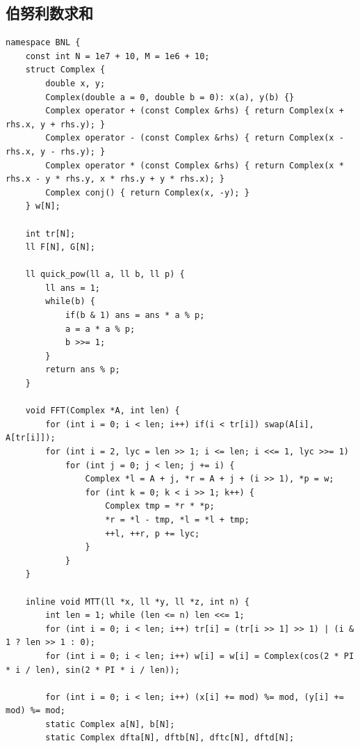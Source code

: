 \documentclass[twoside]{article}
\begin{document}
\subsection{伯努利数求和}
\begin{lstlisting}
namespace BNL {
    const int N = 1e7 + 10, M = 1e6 + 10;
    struct Complex {
        double x, y;
        Complex(double a = 0, double b = 0): x(a), y(b) {}
        Complex operator + (const Complex &rhs) { return Complex(x + rhs.x, y + rhs.y); }
        Complex operator - (const Complex &rhs) { return Complex(x - rhs.x, y - rhs.y); }
        Complex operator * (const Complex &rhs) { return Complex(x * rhs.x - y * rhs.y, x * rhs.y + y * rhs.x); }
        Complex conj() { return Complex(x, -y); }
    } w[N];

    int tr[N];
    ll F[N], G[N];

    ll quick_pow(ll a, ll b, ll p) {
        ll ans = 1;
        while(b) {
            if(b & 1) ans = ans * a % p;
            a = a * a % p;
            b >>= 1;
        }
        return ans % p;
    }

    void FFT(Complex *A, int len) {
        for (int i = 0; i < len; i++) if(i < tr[i]) swap(A[i], A[tr[i]]);
        for (int i = 2, lyc = len >> 1; i <= len; i <<= 1, lyc >>= 1)
            for (int j = 0; j < len; j += i) {
                Complex *l = A + j, *r = A + j + (i >> 1), *p = w;
                for (int k = 0; k < i >> 1; k++) {
                    Complex tmp = *r * *p;
                    *r = *l - tmp, *l = *l + tmp;
                    ++l, ++r, p += lyc;
                }
            }
    }

    inline void MTT(ll *x, ll *y, ll *z, int n) {
        int len = 1; while (len <= n) len <<= 1;
        for (int i = 0; i < len; i++) tr[i] = (tr[i >> 1] >> 1) | (i & 1 ? len >> 1 : 0);
        for (int i = 0; i < len; i++) w[i] = w[i] = Complex(cos(2 * PI * i / len), sin(2 * PI * i / len));

        for (int i = 0; i < len; i++) (x[i] += mod) %= mod, (y[i] += mod) %= mod;
        static Complex a[N], b[N];
        static Complex dfta[N], dftb[N], dftc[N], dftd[N];


\end{lstlisting}
\end{document}
